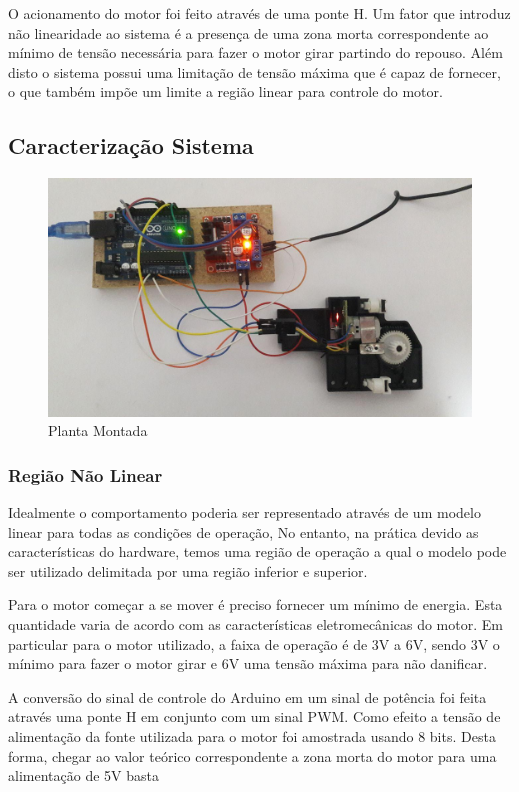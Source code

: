 \documentclass[a4paper,11pt]{article}
\begin{document}
O acionamento do motor foi feito através de uma ponte H. Um fator que introduz não linearidade ao sistema é a presença de uma zona morta correspondente ao mínimo de tensão necessária para fazer o motor girar partindo do repouso. Além disto o sistema possui uma limitação de tensão máxima que é capaz de fornecer, o que também impõe um limite a região linear para controle do motor.

\subsection{Caracterização Sistema}

\begin{figure}[H]
    \centering
    \includegraphics[width=\linewidth]{src/tex/img/full_system.jpg}
    \caption{Planta Montada}
    \label{fig:pid_tinkercad}
\end{figure}

\subsubsection{Região Não Linear}

Idealmente o comportamento poderia ser representado através de um modelo linear para todas as condições de operação, No entanto, na prática devido as características do hardware, temos uma região de operação a qual o modelo pode ser utilizado delimitada por uma região inferior e superior.

Para o motor começar a se mover é preciso fornecer um mínimo de energia. Esta quantidade varia de acordo com as características eletromecânicas do motor. Em particular para o motor utilizado, a faixa de operação é de 3V a 6V, sendo 3V o mínimo para fazer o motor girar e 6V uma tensão máxima para não danificar.

A conversão do sinal de controle do Arduino em um sinal de potência foi feita através uma ponte H em conjunto com um sinal PWM. Como efeito a tensão de alimentação da fonte utilizada para o motor foi amostrada usando 8 bits. Desta forma, chegar ao valor teórico correspondente a zona morta do motor para uma alimentação de 5V basta 
\end{document}
